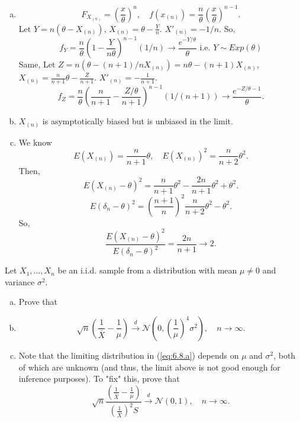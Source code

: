 \begin{solution}
    \begin{enumerate}[(a)]
        \item \[
            F_{X_{(n)}}=\left(\frac{x}{\theta}\right)^n, \quad f(x_{(n)})=\frac{n}{\theta}\left(\frac{x}{\theta}\right)^{n-1}. 
        \]
        Let $Y=n(\theta-X_{(n)})$, $X_{(n)}=\theta-\frac{Y}{n}$. $X'_{(n)}=-1/n$. So, 
        \[
            f_{Y}=\frac{n}{\theta}\left(1-\frac{Y}{n\theta}\right)^{n-1}(1/n)\to \frac{e^{-Y/\theta}}{\theta}\text{ i.e. }Y\sim Exp(\theta)
        \]
        Same, Let $Z=n(\theta-(n+1)/n X_{(n)})=n\theta-(n+1)X_{(n)}$, $X_{(n)}=\frac{n}{n+1}\theta-\frac{Z}{n+1}$. $X'_{(n)}=-\frac{1}{n+1}$. 
        \[
            f_{Z}=\frac{n}{\theta}\left(\frac{n}{n+1}-\frac{Z/\theta}{n+1}\right)^{n-1}(1/(n+1))\to \frac{e^{-Z/\theta-1}}{\theta}. 
        \]
        \item $X_{(n)}$ is asymptotically biased but is unbiased in the limit. 
        \item We know
        \[E(X_{(n)})=\frac{n}{n+1}\theta, \quad E(X_{(n)})^2=\frac{n}{n+2}\theta^2. \]
        Then, 
        \[
            E(X_{(n)}-\theta)^2=\frac{n}{n+1}\theta^2-\frac{2n}{n+1}\theta^2+\theta^2. 
        \]
        \[
            E(\delta_n-\theta)^2=\left(\frac{n+1}{n}\right)^2\frac{n}{n+2}\theta^2-\theta^2. 
        \]
        So, 
        \[
            \frac{E(X_{(n)}-\theta)^2}{E(\delta_n-\theta)^2}=\frac{2n}{n+1}\to2. 
        \]
    \end{enumerate}
\end{solution}

\begin{ex}
    Let \(X_{1}, \ldots, X_{n}\) be an i.i.d. sample from a distribution with mean \(\mu \neq 0\) and variance \(\sigma^{2}\). 
    \begin{enumerate}[(a)]
        \item Prove that
        \item \begin{equation}
            \label{eq:6.8.a}
            \sqrt{n}\left(\frac{1}{\bar{X}}-\frac{1}{\mu}\right) \stackrel{d}{\rightarrow} \mathcal{N}\left(0,\left(\frac{1}{\mu}\right)^{4} \sigma^{2}\right), \quad n \rightarrow \infty. 
        \end{equation}
        \item Note that the limiting distribution in (\ref{eq:6.8.a}) depends on \(\mu\) and \(\sigma^{2}\), both of which are unknown (and thus, the limit above is not good enough for inference purposes). To "fix" this, prove that
        \[
            \sqrt{n} \frac{\left(\frac{1}{\bar{X}}-\frac{1}{\mu}\right)}{\left(\frac{1}{\bar{X}}\right)^{2} S} \stackrel{d}{\rightarrow} \mathcal{N}(0,1), \quad n \rightarrow \infty. 
        \]
    \end{enumerate}
\end{ex}

